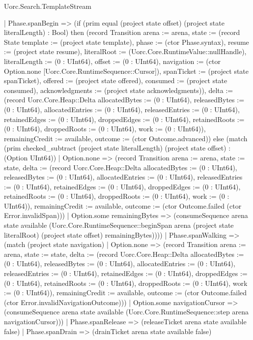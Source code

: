 \begin{lexlean}{Uorc.Search.TemplateStream}
\begin{semanticmodule}
{    | Phase.spanBegin => (if (prim equal (project state offset) (project state literalLength) : Bool) then (record Transition {arena := arena, state := (record State {template := (project state template), phase := (ctor Phase.syntax), resume := (project state resume), literalRoot := (Uorc.Core.RuntimeValue::nullHandle), literalLength := (0 : UInt64), offset := (0 : UInt64), navigation := (ctor Option.none [Uorc.Core.RuntimeSequence::Cursor]), spanTicket := (project state spanTicket), offered := (project state offered), consumed := (project state consumed), acknowledgments := (project state acknowledgments)}), delta := (record Uorc.Core.Heap::Delta {allocatedBytes := (0 : UInt64), releasedBytes := (0 : UInt64), allocatedEntries := (0 : UInt64), releasedEntries := (0 : UInt64), retainedEdges := (0 : UInt64), droppedEdges := (0 : UInt64), retainedRoots := (0 : UInt64), droppedRoots := (0 : UInt64), work := (0 : UInt64)}), remainingCredit := available, outcome := (ctor Outcome.advanced)}) else (match (prim checked_subtract (project state literalLength) (project state offset) : (Option UInt64))
      | Option.none => (record Transition {arena := arena, state := state, delta := (record Uorc.Core.Heap::Delta {allocatedBytes := (0 : UInt64), releasedBytes := (0 : UInt64), allocatedEntries := (0 : UInt64), releasedEntries := (0 : UInt64), retainedEdges := (0 : UInt64), droppedEdges := (0 : UInt64), retainedRoots := (0 : UInt64), droppedRoots := (0 : UInt64), work := (0 : UInt64)}), remainingCredit := available, outcome := (ctor Outcome.failed (ctor Error.invalidSpan))})
      | Option.some remainingBytes => (consumeSequence arena state available (Uorc.Core.RuntimeSequence::beginSpan arena (project state literalRoot) (project state offset) remainingBytes))))
    | Phase.spanWalking => (match (project state navigation)
      | Option.none => (record Transition {arena := arena, state := state, delta := (record Uorc.Core.Heap::Delta {allocatedBytes := (0 : UInt64), releasedBytes := (0 : UInt64), allocatedEntries := (0 : UInt64), releasedEntries := (0 : UInt64), retainedEdges := (0 : UInt64), droppedEdges := (0 : UInt64), retainedRoots := (0 : UInt64), droppedRoots := (0 : UInt64), work := (0 : UInt64)}), remainingCredit := available, outcome := (ctor Outcome.failed (ctor Error.invalidNavigationOutcome))})
      | Option.some navigationCursor => (consumeSequence arena state available (Uorc.Core.RuntimeSequence::step arena navigationCursor)))
    | Phase.spanRelease => (releaseTicket arena state available false)
    | Phase.spanDrain => (drainTicket arena state available false)
}
\end{semanticmodule}
\end{lexlean}
